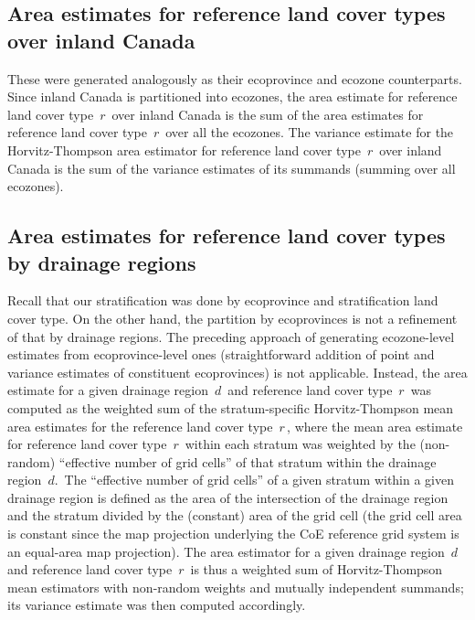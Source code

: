 
\subsection{Area estimates for reference land cover types over inland Canada}
These were generated analogously as their ecoprovince and ecozone counterparts.
Since inland Canada is partitioned into ecozones,
the area estimate for reference land cover type \,$r$\, over inland Canada
is the sum of the area estimates for reference land cover type \,$r$\,
over all the ecozones.
The variance estimate for the Horvitz-Thompson area estimator for 
reference land cover type \,$r$\, over inland Canada
is the sum of the variance estimates of its summands (summing over all ecozones). 


\subsection{Area estimates for reference land cover types by drainage regions}
Recall that our stratification was done by ecoprovince and stratification land cover type.
On the other hand, the partition by ecoprovinces is not a refinement of that by drainage 
regions.
The preceding approach of generating ecozone-level estimates from ecoprovince-level ones
(straightforward addition of point and variance estimates of constituent ecoprovinces)
is not applicable.
Instead, the area estimate for a given drainage region \,$d$\, and reference land 
cover type \,$r$\, was computed as the weighted sum of the stratum-specific Horvitz-Thompson 
mean area estimates for the reference land cover type \,$r$\,, where the mean area estimate
for reference land cover type \,$r$\, within each stratum was weighted by the (non-random) 
``effective number of grid cells'' of that stratum within the drainage region \,$d$.\,
The ``effective number of grid cells'' of a given stratum within a given drainage region
is defined as the area of the intersection of the drainage region and the stratum
divided by the (constant) area of the grid cell (the grid cell area
is constant since the map projection underlying the CoE reference grid system
is an equal-area map projection).
The area estimator for a given drainage region \,$d$\, and reference land cover type \,$r$\,
is thus a weighted sum of Horvitz-Thompson mean estimators with non-random weights and
mutually independent summands; its variance estimate was then computed accordingly. 

